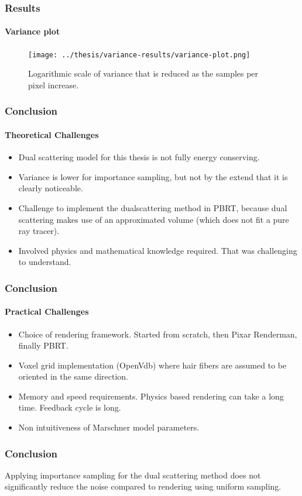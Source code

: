 \documentclass{beamer}
\begin{document}
\begin{frame}
    \frametitle{Results}
    \framesubtitle{Variance plot}
    
    \begin{figure}
    \centering
    \texttt{[image: ../thesis/variance-results/variance-plot.png]} 
    \caption{Logarithmic scale of variance that is reduced as the samples per pixel increase.}
    \end{figure}
  \end{frame}
  
  
  \begin{frame}
    \frametitle{Conclusion}
    \framesubtitle{Theoretical Challenges}
	
	\begin{itemize}
	\item Dual scattering model for this thesis is not fully energy conserving.
	\item Variance is lower for importance sampling, but not by the extend that it is clearly noticeable.
	\item Challenge to implement the dualscattering method in PBRT, because dual scattering makes use of an approximated volume (which does not fit a pure ray tracer).
	\item Involved physics and mathematical knowledge required. That was challenging to understand.
	\end{itemize}
  \end{frame}
  
  \begin{frame}
    \frametitle{Conclusion}
    \framesubtitle{Practical Challenges}
	
	\begin{itemize}
	\item Choice of rendering framework. Started from scratch, then Pixar Renderman, finally PBRT.
	\item Voxel grid implementation (OpenVdb) where hair fibers are assumed to be oriented in the same direction.
	\item Memory and speed requirements. Physics based rendering can take a long time. Feedback cycle is long.
	\item Non intuitiveness of Marschner model parameters.
	\end{itemize}
  \end{frame}
  
  \begin{frame}
  \frametitle{Conclusion}
  
  Applying importance sampling for the dual scattering method does not significantly reduce the noise compared to rendering using uniform sampling.
  \end{frame}
  
\end{document}
